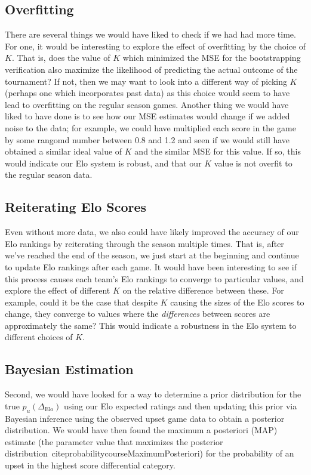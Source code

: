 \documentclass{article}
\begin{document}
\subsection{Overfitting}
There are several things we would have liked to check if we had had more time. For one, it would be interesting to explore the effect of overfitting by the choice of $K$. That is, does the value of $K$ which minimized the MSE for the bootstrapping verification also maximize the likelihood of predicting the actual outcome of the tournament? If not, then we may want to look into a different way of picking $K$ (perhaps one which incorporates past data) as this choice would seem to have lead to overfitting on the regular season games. Another thing we would have liked to have done is to see how our MSE estimates would change if we added noise to the data; for example, we could have multiplied each score in the game by some rangomd number between 0.8 and 1.2 and seen if we would still have obtained a similar ideal value of $K$ and the similar MSE for this value. If so, this would indicate our Elo system is robust, and that our $K$ value is not overfit to the regular season data.

\subsection{Reiterating Elo Scores}
Even without more data, we also could have likely improved the accuracy of our Elo rankings by reiterating through the season multiple times. That is, after we've reached the end of the season, we just start at the beginning and continue to update Elo rankings after each game. It would have been interesting to see if this process causes each team's Elo rankings to converge to particular values, and explore the effect of different $K$ on the relative difference between these. For example, could it be the case that despite $K$ causing the sizes of the Elo scores to change, they converge to values where the \textit{differences} between scores are approximately the same? This would indicate a robustness in the Elo system to different choices of $K$.

\subsection{Bayesian Estimation}
Second, we would have looked for a way to determine a prior distribution for the true ${p}_u(\Delta_{\text{Elo}})$ using our Elo expected ratings and then updating this prior via Bayesian inference using the observed upset game data to obtain a posterior distribution. We would have then found the maximum a posteriori (MAP) estimate (the parameter value that maximizes the posterior distribution~cite{probabilitycourseMaximumPosteriori}) for the probability of an upset in the highest score differential category.
\end{document}
